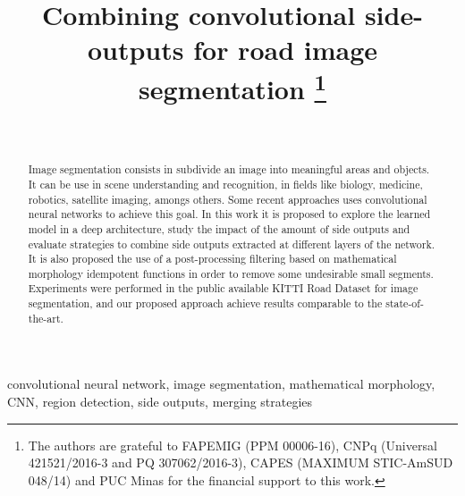 \documentclass[conference]{IEEEtran}
\begin{document}
\title{Combining convolutional side-outputs for road image segmentation
\thanks{The authors are grateful to FAPEMIG (PPM 00006-16), CNPq (Universal 421521/2016-3 and PQ 307062/2016-3), CAPES (MAXIMUM STIC-AmSUD 048/14) and PUC Minas for the financial support to this work.}
}

\author{
\\
}

\maketitle

\begin{abstract}
Image segmentation consists in subdivide an image into meaningful areas and objects. It can be use in scene understanding and recognition, in fields like biology, medicine, robotics, satellite imaging, amongs others. Some recent approaches uses convolutional neural networks to achieve this goal. In this work it is proposed to explore the learned model in a deep architecture, study the impact of the amount of side outputs and evaluate strategies to combine side outputs extracted at different layers of the network. It is also proposed the use of a post-processing filtering based on mathematical morphology idempotent functions in order to remove some undesirable small segments. Experiments were performed in the public available KITTI Road Dataset for image segmentation, and our proposed approach achieve results comparable to the state-of-the-art.
\end{abstract}


\begin{IEEEkeywords}
convolutional neural network, image segmentation, mathematical morphology, CNN, region detection, side outputs, merging strategies
\end{IEEEkeywords}


%







\end{document}
